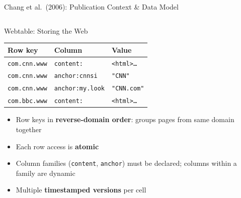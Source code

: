 \documentclass[aspectratio=169,10pt]{beamer}
\begin{document}
\begin{frame}{Chang et al.\ (2006): Publication Context \& Data Model}
\begin{columns}[T]
      \begin{exampleblock}{Webtable: Storing the Web}
        \scriptsize
        \renewcommand{\arraystretch}{1.2}
        \begin{tabular}{@{}lll@{}}
          \toprule
          \textbf{Row key}     & \textbf{Column}     & \textbf{Value} \\
          \midrule
          \texttt{com.cnn.www} & \texttt{content:}   & \texttt{<html>…} \\
          \texttt{com.cnn.www} & \texttt{anchor:cnnsi}& \texttt{"CNN"} \\
          \texttt{com.cnn.www} & \texttt{anchor:my.look}& \texttt{"CNN.com"} \\
          \texttt{com.bbc.www} & \texttt{content:}   & \texttt{<html>…} \\
          \bottomrule
        \end{tabular}
        \vspace{4pt}
        \begin{itemize}
          \item Row keys in \textbf{reverse-domain order}:
                groups pages from same domain together
          \item Each row access is \textbf{atomic}
          \item Column families (\texttt{content}, \texttt{anchor})
                must be declared; columns within a family are dynamic
          \item Multiple \textbf{timestamped versions} per cell
        \end{itemize}
      \end{exampleblock}
  \end{columns}
\end{frame}
\end{document}
